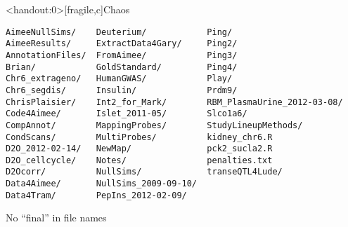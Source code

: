 \documentclass[aspectratio=169,12pt,t]{beamer}
\begin{document}
\begin{frame}<handout:0>[fragile,c]{Chaos}

\addtocounter{framenumber}{-1}

\begin{center}
\begin{minipage}[c]{11.33cm}
\begin{semiverbatim}
\lstset{basicstyle=\scriptsize}
\begin{lstlisting}[linewidth=11.33cm]
AimeeNullSims/    Deuterium/            Ping/
AimeeResults/     ExtractData4Gary/     Ping2/
AnnotationFiles/  FromAimee/            Ping3/
Brian/            GoldStandard/         Ping4/
Chr6_extrageno/   HumanGWAS/            Play/
Chr6_segdis/      Insulin/              Prdm9/
ChrisPlaisier/    Int2_for_Mark/        RBM_PlasmaUrine_2012-03-08/
Code4Aimee/       Islet_2011-05/        Slco1a6/
CompAnnot/        MappingProbes/        StudyLineupMethods/
CondScans/        MultiProbes/          kidney_chr6.R
D2O_2012-02-14/   NewMap/               pck2_sucla2.R
D2O_cellcycle/    Notes/                penalties.txt
D2Ocorr/          NullSims/             transeQTL4Lude/
Data4Aimee/       NullSims_2009-09-10/
Data4Tram/        PepIns_2012-02-09/
\end{lstlisting}
\end{semiverbatim}
\end{minipage}
\end{center}

\end{frame}




\begin{frame}[c]{No ``{\hilit final}'' in file names}

\vspace*{3mm}

\centering



\end{frame}
\end{document}
